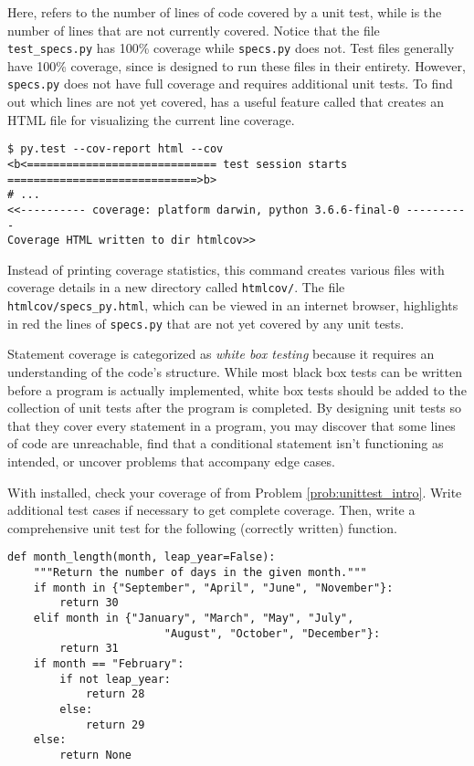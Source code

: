 Here,  refers to the number of lines of code covered by a unit test, while  is the number of lines that are not currently covered.
Notice that the file \texttt{test\_specs.py} has 100\% coverage while \texttt{specs.py} does not.
Test files generally have 100\% coverage, since  is designed to run these files in their entirety.
However, \texttt{specs.py} does not have full coverage and requires additional unit tests.
To find out which lines are not yet covered,  has a useful feature called  that creates an HTML file for visualizing the current line coverage.

\begin{lstlisting}
$ py.test --cov-report html --cov
<b<============================= test session starts =============================>b>
# ...
<<---------- coverage: platform darwin, python 3.6.6-final-0 ----------
Coverage HTML written to dir htmlcov>>
\end{lstlisting}

Instead of printing coverage statistics, this command creates various files with coverage details in a new directory called \texttt{htmlcov/}.
The file \texttt{htmlcov/specs\_py.html}, which can be viewed in an internet browser, highlights in red the lines of \texttt{specs.py} that are not yet covered by any unit tests.

\begin{info} %
Statement coverage is categorized as \emph{white box testing} because it requires an understanding of the code's structure.
While most black box tests can be written before a program is actually implemented, white box tests should be added to the collection of unit tests after the program is completed.
By designing unit tests so that they cover every statement in a program, you may discover that some lines of code are unreachable, find that a conditional statement isn't functioning as intended, or uncover problems that accompany edge cases.
\end{info}

\begin{problem} %
With  installed, check your coverage of  from Problem \ref{prob:unittest_intro}.
Write additional test cases if necessary to get complete coverage.
Then, write a comprehensive unit test for the following (correctly written) function.

\begin{lstlisting}
def month_length(month, leap_year=False):
    """Return the number of days in the given month."""
    if month in {"September", "April", "June", "November"}:
        return 30
    elif month in {"January", "March", "May", "July",
                        "August", "October", "December"}:
        return 31
    if month == "February":
        if not leap_year:
            return 28
        else:
            return 29
    else:
        return None
\end{lstlisting}
\end{problem}

